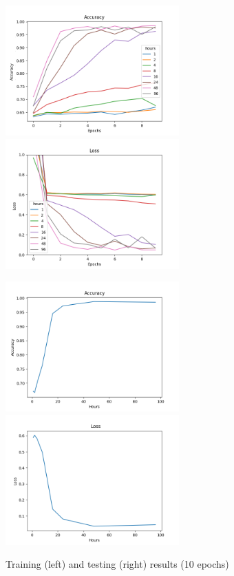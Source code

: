 \begin{figure}
      \begin{multicols}{2}
            \includegraphics[height=5cm]{img/control_condition/plot_acc_train.png}
            \includegraphics[height=5cm]{img/control_condition/plot_loss_train.png}

            \includegraphics[height=5cm]{img/control_condition/plot_acc_eval.png}
            \includegraphics[height=5cm]{img/control_condition/plot_loss_eval.png}
      \end{multicols}
      \caption{Training (left) and testing (right) results (10 epochs)}
      \label{figure:control_condition_10e}
\end{figure}

